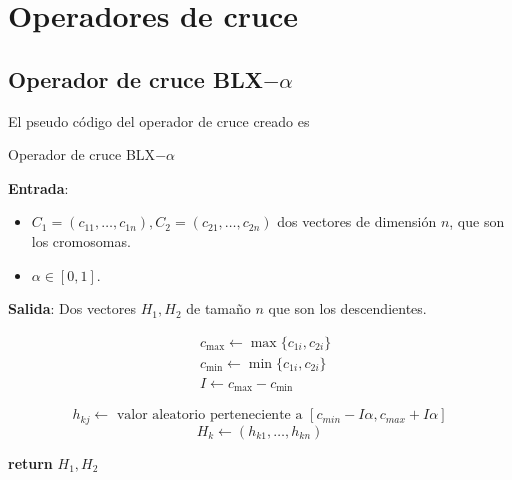 
\section{Operadores de cruce}  

\subsection{ Operador de cruce BLX$-\alpha$}  

El pseudo código del operador de cruce creado es 

\begin{algorithm}[H]
    \caption{Operador de cruce BLX$-\alpha$}
    \hspace*{\algorithmicindent} 

        \textbf{Entrada}:
        \begin{itemize}
          \item $C_1 = (c_{1 1}, \ldots, c_{1 n}), C_2=(c_{2 1}, \ldots, c_{2 n})$ 
          dos vectores de dimensión $n$, que son los cromosomas. 
          \item  $\alpha \in [0,1]$.
        \end{itemize}
        
        \hspace*{\algorithmicindent} 

        \textbf{Salida}:
        Dos vectores $H_1, H_2$ de tamaño $n$ que son los descendientes.

    \begin{algorithmic}[1]
              \begin{align*}
                & c_{\max} \gets \max\{ c_{1 i}, c_{2 i}\} \\
                & c_{\min} \gets \min\{ c_{1 i}, c_{2 i}\} \\
                & I \gets c_{\max} - c_{\min} 
              \end{align*}
          
              $$h_{k j} \gets
              \text{ valor aleatorio perteneciente a } 
             [c_{min} - I \alpha, c_{max} + I \alpha]$$
           \EndFor 
           \EndFor 
             $$H_k \gets (h_{k 1}, \ldots, h_{k n}) $$
          \EndFor 
          
       \State \textbf{return} $H_1, H_2$
    \end{algorithmic}
  \end{algorithm}

